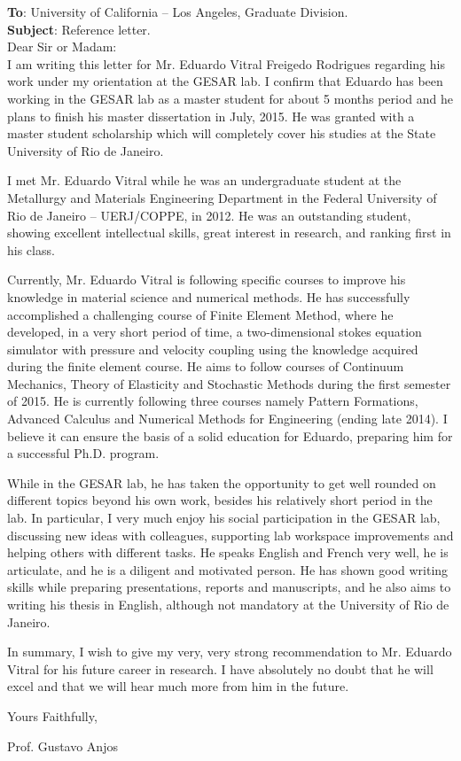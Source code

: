 \documentclass[12pt,a4paper]{article}
\begin{document}
\vspace*{1.5cm}
\noindent \textbf{To}: University of California -- Los Angeles, Graduate Division.\\
\noindent \textbf{Subject}: Reference letter.\\

\noindent Dear Sir or Madam:\\

I am writing this letter for Mr. Eduardo Vitral Freigedo Rodrigues
regarding his work under my orientation at the GESAR lab. I confirm
that Eduardo has been working in the GESAR lab as a master student for
about 5 months period and he plans to finish his master dissertation in
July, 2015. He was granted with a master student scholarship which will
completely cover his studies at the State University of Rio de
Janeiro.

I met Mr. Eduardo Vitral while he was an undergraduate student at the
Metallurgy and Materials Engineering Department in the Federal University
of Rio de Janeiro -- UERJ/COPPE, in 2012. He was an outstanding student,
showing excellent intellectual skills, great interest in research, and
ranking first in his class.

Currently, Mr. Eduardo Vitral is following specific courses to improve
his knowledge in material science and numerical methods. He has
successfully accomplished a challenging course of Finite Element Method,
where he developed, in a very short period of time, a two-dimensional
stokes equation simulator with pressure and velocity coupling using the
knowledge acquired during the finite element course. He aims to follow
courses of Continuum Mechanics, Theory of Elasticity and Stochastic
Methods during the first semester of 2015. He is currently following
three courses namely Pattern Formations, Advanced Calculus and Numerical
Methods for Engineering (ending late 2014). I believe it can ensure
the basis of a solid education for Eduardo, preparing him for a
successful Ph.D. program. 

While in the GESAR lab, he has taken the opportunity to get well rounded
on different topics beyond his own work, besides his relatively short
period in the lab. In particular, I very much enjoy his social
participation in the GESAR lab, discussing new ideas with colleagues,
supporting lab workspace improvements and helping others with different
tasks. He speaks English and French very well, he is articulate, and he
is a diligent and motivated person. He has shown good writing skills
while preparing presentations, reports and manuscripts, and he also
aims to writing his thesis in English, although not mandatory at the
University of Rio de Janeiro.

In summary, I wish to give my very, very strong recommendation to Mr.
Eduardo Vitral for his future career in research. I have absolutely no
doubt that he will excel and that we will hear much more from him in the
future.

Yours Faithfully,

\vspace{2cm}

\begin{center}
Prof. Gustavo Anjos
\end{center}
\end{document}
